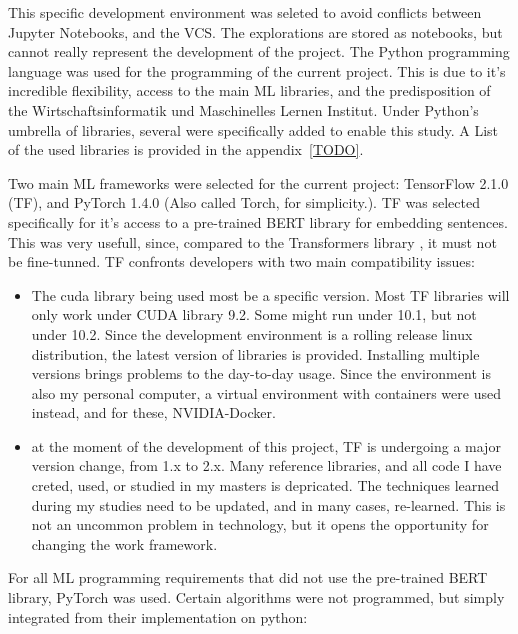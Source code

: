 This specific development environment was seleted to avoid conflicts between Jupyter Notebooks, and the VCS. The explorations are stored as notebooks, but cannot really represent the development of the project.
The Python programming language was used for the programming of the current project. This is due to it's incredible flexibility, access to the main ML libraries, and the predisposition of the Wirtschaftsinformatik und Maschinelles Lernen Institut. Under Python's umbrella of libraries, several were specifically added to enable this study. A List of the used libraries is provided in the appendix~\ref{TODO}.

Two main ML frameworks were selected for the current project: TensorFlow 2.1.0 \cite{TODO} (TF), and PyTorch 1.4.0 \cite{TODO} (Also called Torch, for simplicity.). TF was selected specifically for it's access to a pre-trained BERT library \cite{} for embedding sentences. This was very usefull, since, compared to the Transformers library \cite{TODO}, it must not be fine-tunned. TF confronts developers with two main compatibility issues:

\begin{itemize}
  \item The cuda library being used most be a specific version. Most TF libraries will only work under CUDA library 9.2. Some might run under 10.1, but not under 10.2. Since the development environment is a rolling release linux distribution, the latest version of libraries is provided. Installing multiple versions brings problems to the day-to-day usage. Since the environment is also my personal computer, a virtual environment with containers were used instead, and for these, NVIDIA-Docker.

  \item at the moment of the development of this project, TF is undergoing a major version change, from 1.x to 2.x. Many reference libraries, and all code I have creted, used, or studied in my masters is depricated. The techniques learned during my studies need to be updated, and in many cases, re-learned.
  This is not an uncommon problem in technology, but it opens the opportunity for changing the work framework.
\end{itemize}

For all ML programming requirements that did not use the pre-trained BERT library, PyTorch was used. Certain algorithms were not programmed, but simply integrated from their implementation on python:

